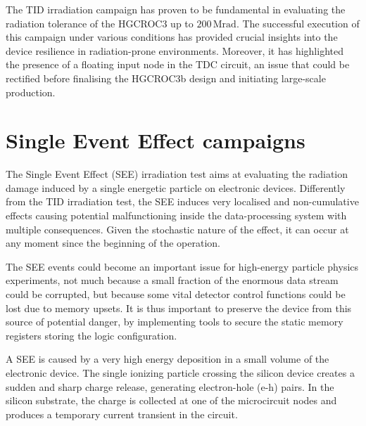 \bigbreak

The TID irradiation campaign has proven to be fundamental in evaluating the radiation tolerance of the HGCROC3 up to $200\,\textrm{Mrad}$. The successful execution of this campaign under various conditions has provided crucial insights into the device resilience in radiation-prone environments. 
Moreover, it has highlighted the presence of a floating input node in the TDC circuit, an issue that could be rectified before finalising the HGCROC3b design and initiating large-scale production. 


\section{Single Event Effect campaigns}
\label{sec:Single Event Effect}

The Single Event Effect (SEE) irradiation test aims at evaluating the radiation damage induced by a single energetic particle on electronic devices. Differently from the TID irradiation test, the SEE induces very localised and non-cumulative effects causing potential malfunctioning inside the data-processing system with multiple consequences. Given the stochastic nature of the effect, it can occur at any moment since the beginning of the operation.

The SEE events could become an important issue for high-energy particle physics experiments, not much because a small fraction of the enormous data stream could be corrupted, but because some vital detector control functions could be lost due to memory upsets. It is thus important to preserve the device from this source of potential danger, by implementing tools to secure the static memory registers storing the logic configuration.

\bigbreak

A SEE is caused by a very high energy deposition in a small volume of the electronic device. The single ionizing particle crossing the silicon device creates a sudden and sharp charge release, generating electron-hole (e-h) pairs. In the silicon substrate, the charge is collected at one of the microcircuit nodes and produces a temporary current transient in the circuit. 


